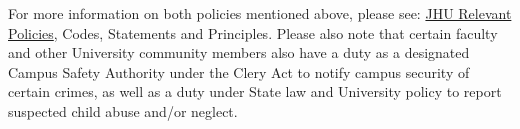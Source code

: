 \documentclass[11pt]{article}
\begin{document}
For more information on both policies mentioned above, please see: \href{http://oie.jhu.edu/policies-and-laws/jhu-policies/index.html}{JHU Relevant Policies}, Codes, Statements and Principles. Please also note that certain faculty and other University community members also have a duty as a designated Campus Safety Authority under the Clery Act to notify campus security of certain crimes, as well as a duty under State law and University policy to report suspected child abuse and/or neglect. \\
\end{document}
